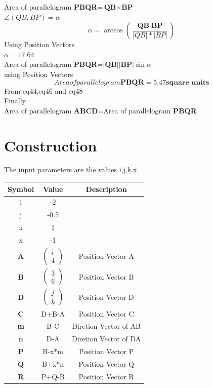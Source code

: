 \documentclass[journal,10pt,twocolumn]{article}
\begin{document}
Area of parallelogram \textbf{PBQR}=$\textbf{QB} \times \textbf{BP}$\\
 $\angle(QB,BP)=\alpha$
 \begin{equation}
     \alpha=\arccos(\frac{\textbf{QB}\cdot\textbf{BP}}{|QB|*|BP|})
 \end{equation}
 Using Position Vectors\\
$\alpha=17.64$\\
 Area of parallelogram \textbf{PBQR}=$|\textbf{QB}||\textbf{BP}|\sin{\alpha}$\\
 using Position Vectors
\begin{equation}
     Area of parallelogram \textbf{PBQR}=5.47 \textbf{square units}
\end{equation}
From eq44,eq46 and eq48\\
Finally\\
Area of parallelogram \textbf{ABCD}=Area of parallelogram \textbf{PBQR}
\section*{Construction}
The input parameters are the values i,j,k,x.\\
{
\setlength\extrarowheight{2pt}
\begin{tabular}{|c|c|c|}
  \hline
  \textbf{Symbol}&\textbf{Value}&\textbf{Description}\\
  \hline
  i&-2&\\
  \hline
  j&-0.5&\\
  \hline
  k&1&\\
  \hline
  x&-1&\\
  \hline
	\textbf{A}&
	$\begin{pmatrix}
		i\\
		4
	 \end{pmatrix}$
  &Position Vector A\\
  \hline
	\textbf{B}&
	$\begin{pmatrix}
		3\\
		6
	\end{pmatrix}$
	&Position Vector B\\
  \hline
	\textbf{D}&$
   \begin{pmatrix}
		j\\
		k
    \end{pmatrix}$
	& Position Vector D\\
  \hline
	\textbf{C}&D+B-A&Position Vector C\\
  \hline
	\textbf{m}&B-C&Diretion Vector of AB\\
  \hline
	\textbf{n}&D-A&Diretion Vector of DA\\
  \hline
	\textbf{P}&B-x*m&Position Vector P\\
  \hline
	\textbf{Q}&B+x*n&Position Vector Q\\
  \hline
	\textbf{R}&P+Q-B&Position Vector R\\
  \hline
\end{tabular}
}
\end{document}

